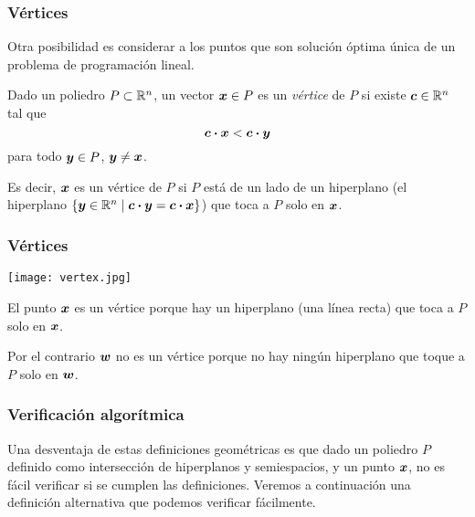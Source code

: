 \documentclass[aspectratio=169,12pt,spanish]{beamer}
\begin{document}

\begin{frame}
\frametitle{Vértices}

Otra posibilidad es considerar a los puntos que son solución óptima única de un problema de programación lineal.

\begin{definition}
Dado un poliedro $P \subset \mathbb{R}^n$, un vector $\bm{x} \in P$ es un \emph{vértice} de $P$ si
existe $\bm{c} \in \mathbb{R}^n$ tal que
$$\bm{c} \boldsymbol{\cdot} \bm{x} < \bm{c} \boldsymbol{\cdot} \bm{y}$$
para todo $\bm{y} \in P$, $\bm{y} \neq \bm{x}$.
\end{definition}

Es decir, $\bm{x}$ es un vértice de $P$ si $P$ está de un lado de un hiperplano (el hiperplano $\{\bm{y} \in \mathbb{R}^n \mid \bm{c} \boldsymbol{\cdot} \bm{y} = \bm{c} \boldsymbol{\cdot} \bm{x}\}$) que toca a $P$ solo en $\bm{x}$.


\end{frame}


\begin{frame}
\frametitle{Vértices}

\begin{center}
\texttt{[image: vertex.jpg]}
\end{center}

El punto $\bm{x}$ es un vértice porque hay un hiperplano (una línea recta) que toca a $P$ solo en $\bm{x}$.

Por el contrario $\bm{w}$ no es un vértice porque no hay ningún hiperplano que toque a $P$ solo en $\bm{w}$.

\end{frame}


\begin{frame}
\frametitle{Verificación algorítmica}

Una desventaja de estas definiciones geométricas es que dado un poliedro $P$ definido como intersección de hiperplanos y semiespacios, y un punto $\bm{x}$, no es fácil verificar si se cumplen las definiciones. Veremos a continuación una definición alternativa que podemos verificar fácilmente.

\end{frame}

\end{document}
